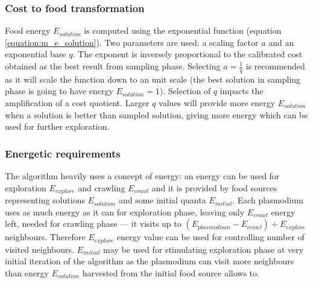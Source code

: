 \documentclass[english,a4paper,twoside]{ppfcmthesis}
\begin{document}
\subsubsection{Cost to food transformation}

Food energy $E_{solution}$ is computed using the exponential function (equation \ref{equation:m_e_solution}). Two parameters are used: a scaling factor $a$ and  an exponential base $q$. The exponent is inversely proportional to the calibrated cost obtained as the best result from sampling phase. Selecting $a = \frac{1}{q}$ is recommended as it will scale the function down to an unit scale (the best solution in sampling phase is going to have energy $E_{solution} = 1$). Selection of $q$ impacts the amplification of a cost quotient. Larger $q$ values will provide more energy $E_{solution}$ when a solution is better than sampled solution, giving more energy which can be used for further exploration.


\subsubsection{Energetic requirements}

The algorithm heavily uses a concept of energy: an energy can be used for exploration $E_{explore}$ and crawling $E_{crawl}$ and it is provided by food sources representing solutions $E_{solution}$ and some initial quanta $E_{initial}$. Each plasmodium uses as much energy as it can for exploration phase, leaving only $E_{crawl}$ energy left, needed for crawling phase --- it visits up to $(E_{plasmodium} - E_{crawl}) \div E_{explore}$ neighbours. Therefore $E_{explore}$ energy value can be used for controlling number of visited neighbours. $E_{initial}$ may be used for stimulating exploration phase at very initial iteration of the algorithm as the plasmodium can visit more neighbours than energy $E_{solution}$ harvested from the initial food source allows to.
\end{document}
